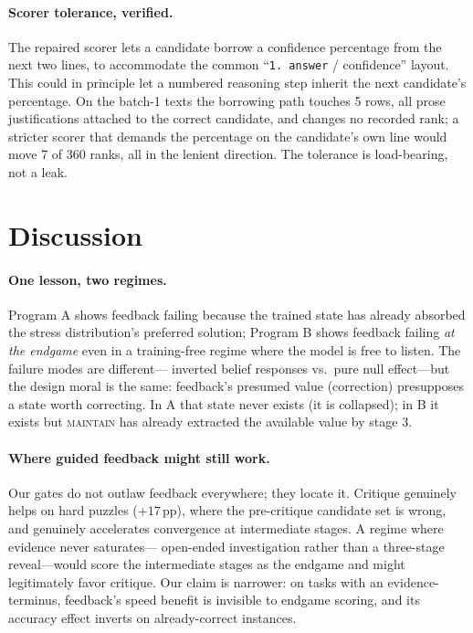 \documentclass[10pt]{article}
\newcommand{\Mmaint}{\textsc{maintain}}
\begin{document}
\paragraph{Scorer tolerance, verified.}
The repaired scorer lets a candidate borrow a confidence percentage from
the next two lines, to accommodate the common ``\texttt{1.~answer} /
confidence'' layout. This could in principle let a numbered reasoning
step inherit the next candidate's percentage. On the batch-1 texts the
borrowing path touches 5 rows, all prose justifications attached to the
correct candidate, and changes no recorded rank; a stricter scorer that
demands the percentage on the candidate's own line would move 7 of 360
ranks, all in the lenient direction. The tolerance is load-bearing, not
a leak.

\section{Discussion}
\label{sec:discussion}

\paragraph{One lesson, two regimes.}
Program A shows feedback failing because the trained state has already
absorbed the stress distribution's preferred solution; Program B shows
feedback failing \emph{at the endgame} even in a training-free regime
where the model is free to listen. The failure modes are different---%
inverted belief responses vs.\ pure null effect---but the design moral is
the same: feedback's presumed value (correction) presupposes a state
worth correcting. In A that state never exists (it is collapsed); in B it
exists but \Mmaint{} has already extracted the available value by stage 3.

\paragraph{Where guided feedback might still work.}
Our gates do not outlaw feedback everywhere; they locate it. Critique
genuinely helps on hard puzzles ($+17$\,pp), where the pre-critique
candidate set is wrong, and genuinely accelerates convergence at
intermediate stages. A regime where evidence never saturates---%
open-ended investigation rather than a three-stage reveal---would score
the intermediate stages as the endgame and might legitimately favor
critique. Our claim is narrower: on tasks with an evidence-terminus,
feedback's speed benefit is invisible to endgame scoring, and its
accuracy effect inverts on already-correct instances.
\end{document}
